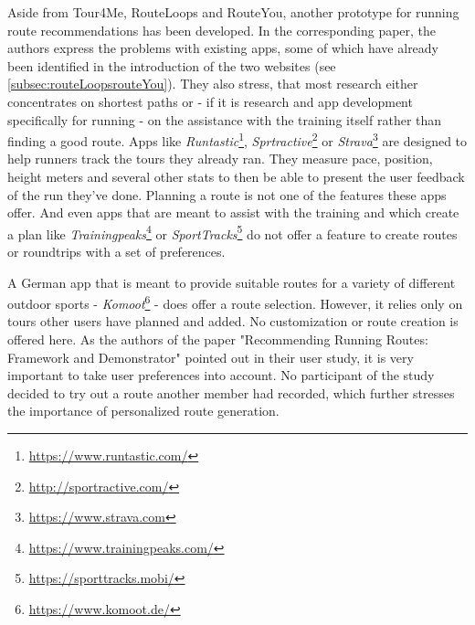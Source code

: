 Aside from Tour4Me, RouteLoops and RouteYou, another prototype for running route recommendations has been developed.
In the corresponding paper\cite{loepp_recommending_nodate}, the authors express the problems with existing apps, some of which have already been identified in the introduction of the two websites (see \ref{subsec:routeLoopsrouteYou}).
They also stress, that most research either concentrates on shortest paths or - if it is research and app development specifically for running - on the assistance with the training itself rather than finding a good route.
Apps like \textit{Runtastic}\footnote{\url{https://www.runtastic.com/}}, \textit{Sprtractive}\footnote{\url{http://sportractive.com/}} or \textit{Strava}\footnote{\url{https://www.strava.com}} are designed to help runners track the tours they already ran. 
They measure pace, position, height meters and several other stats to then be able to present the user feedback of the run they've done. 
Planning a route is not one of the features these apps offer.
And even apps that are meant to assist with the training and which create a plan like \textit{Trainingpeaks}\footnote{\url{https://www.trainingpeaks.com/}} or \textit{SportTracks}\footnote{\url{https://sporttracks.mobi/}} do not offer a feature to create routes or roundtrips with a set of preferences\cite{loepp_recommending_nodate}.

A German app that is meant to provide suitable routes for a variety of different outdoor sports - \textit{Komoot}\footnote{\url{https://www.komoot.de/}} - does offer a route selection. 
However, it relies only on tours other users have planned and added. No customization or route creation is offered here. 
As the authors of the paper "Recommending Running Routes: Framework and Demonstrator"\cite{loepp_recommending_nodate} pointed out in their user study, it is very important to take user preferences into account. 
No participant of the study decided to try out a route another member had recorded, which further stresses the importance of personalized route generation\cite{loepp_recommending_nodate}.

